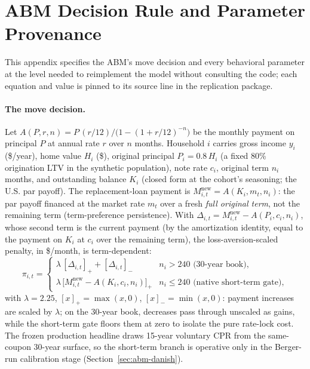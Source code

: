 \documentclass[12pt]{article}
\begin{document}
\section{ABM Decision Rule and Parameter Provenance}\label{app:abmspec}

This appendix specifies the ABM's move decision and every behavioral parameter at the level needed to reimplement the model without consulting the code; each equation and value is pinned to its source line in the replication package.

\paragraph{The move decision.}
Let $A(P,r,n) = P\,(r/12)\big/\big(1-(1+r/12)^{-n}\big)$ be the monthly payment on principal $P$ at annual rate $r$ over $n$ months. %
Household $i$ carries gross income $y_i$ (\$/year), home value $H_i$ (\$), original principal $P_i = 0.8\,H_i$ (a fixed 80\% origination LTV in the synthetic population), note rate $c_i$, original term $n_i$ months, and outstanding balance $K_i$ (closed form at the cohort's seasoning; the U.S. par payoff). %
The replacement-loan payment is $M^{\mathrm{new}}_{i,t} = A(K_i, m_t, n_i)$: the par payoff financed at the market rate $m_t$ over a fresh \emph{full original term}, not the remaining term (term-preference persistence). %
With $\Delta_{i,t} = M^{\mathrm{new}}_{i,t} - A(P_i, c_i, n_i)$, whose second term is the current payment (by the amortization identity, equal to the payment on $K_i$ at $c_i$ over the remaining term), the loss-aversion-scaled penalty, in \$/month, is term-dependent:
\begin{equation}\label{eq:abmpenalty}
\pi_{i,t} =
\begin{cases}
\lambda\,[\Delta_{i,t}]_{+} + [\Delta_{i,t}]_{-} & n_i > 240 \text{ (30-year book)},\\
\lambda\,\big[M^{\mathrm{new}}_{i,t} - A(K_i, c_i, n_i)\big]_{+} & n_i \le 240 \text{ (native short-term gate)},
\end{cases}
\end{equation}
with $\lambda = 2.25$, $[x]_{+} = \max(x,0)$, $[x]_{-} = \min(x,0)$: payment increases are scaled by $\lambda$; on the 30-year book, decreases pass through unscaled as gains, while the short-term gate floors them at zero to isolate the pure rate-lock cost. The frozen production headline draws 15-year voluntary CPR from the same-coupon 30-year surface, so the short-term branch is operative only in the Berger-run calibration stage (Section~\ref{sec:abm-danish}).
\end{document}
